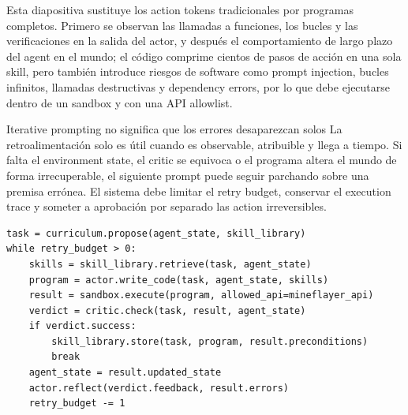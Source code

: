 
Esta diapositiva sustituye los action tokens tradicionales por programas completos. Primero se observan las llamadas a funciones, los bucles y las verificaciones en la salida del actor, y después el comportamiento de largo plazo del agent en el mundo; el código comprime cientos de pasos de acción en una sola skill, pero también introduce riesgos de software como prompt injection, bucles infinitos, llamadas destructivas y dependency errors, por lo que debe ejecutarse dentro de un sandbox y con una API allowlist.


\begin{warningbox}{Iterative prompting no significa que los errores desaparezcan solos}
La retroalimentación solo es útil cuando es observable, atribuible y llega a tiempo. Si falta el environment state, el critic se equivoca o el programa altera el mundo de forma irrecuperable, el siguiente prompt puede seguir parchando sobre una premisa errónea. El sistema debe limitar el retry budget, conservar el execution trace y someter a aprobación por separado las action irreversibles.
\end{warningbox}

\begin{lstlisting}[caption={Ciclo conceptual de Voyager: generación de código, retroalimentación de ejecución y skill memory}]
task = curriculum.propose(agent_state, skill_library)
while retry_budget > 0:
    skills = skill_library.retrieve(task, agent_state)
    program = actor.write_code(task, agent_state, skills)
    result = sandbox.execute(program, allowed_api=mineflayer_api)
    verdict = critic.check(task, result, agent_state)
    if verdict.success:
        skill_library.store(task, program, result.preconditions)
        break
    agent_state = result.updated_state
    actor.reflect(verdict.feedback, result.errors)
    retry_budget -= 1
\end{lstlisting}


